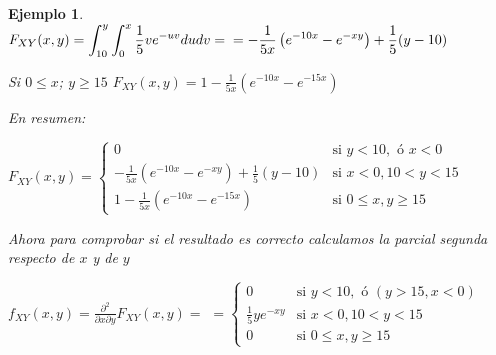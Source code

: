 \documentclass[12pt]{report}
\newtheorem{example}[definition]{Ejemplo}
\begin{document}
\begin{example}
    $\displaystyle F_{XY}(x,y)=\int_{10}^{y}\int_{0}^{x} \frac{1}{5} v
    e^{-uv}du dv=\newline =-\frac{1}{5x}
   \left(e^{-10x}-e^{-x y}\right)+\frac{1}{5}(y-10)$


    Si $0\leq x$; $y\geq 15$\newline
    $F_{XY}(x,y)=1-\frac{1}{5x}\left(e^{-10x}-e^{-15x}\right)$

    En resumen:

    $F_{XY}(x,y)=$\newline$\left\{\begin{array}{ll}
    0 &  \mbox{si } y<10, \mbox{ ó } x<0\\
 \scriptstyle{ -\frac{1}{5x}
    \left(e^{-10x}-e^{-x y}\right)+\frac{1}{5}(y-10) }& \mbox{si } x<0,
   10<y<15\\
   1-\frac{1}{5x}\left(e^{-10x}-e^{-15x}\right)& \mbox{si } 0\leq x,
   y\geq 15
  \end{array}\right.$

  Ahora para comprobar si el resultado es correcto calculamos la
  parcial segunda respecto de $x$ y de $y$

  $f_{XY}(x,y)=\frac{\partial^2}{\partial x\partial y}
  F_{XY}(x,y)=$\newline
$=  \left\{\begin{array}{ll}
    0 &  \mbox{si } y<10, \mbox{ ó } (y>15, x<0)\\
   \frac{1}{5} y e^{-xy} & \mbox{si } x<0,
   10<y<15\\
  0 & \mbox{si } 0\leq x,
   y\geq 15
  \end{array}\right.$
\end{example}
\end{document}
